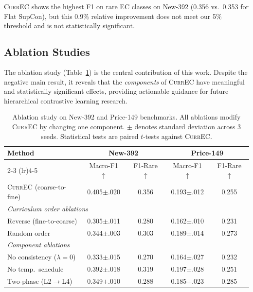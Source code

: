 \documentclass{article}
\newcommand{\currec}{\textsc{CurrEC}}
\begin{document}
\currec{} shows the highest F1 on rare EC classes on New-392 (0.356 vs.\ 0.353 for Flat SupCon), but this 0.9\% relative improvement does not meet our 5\% threshold and is not statistically significant.

\subsection{Ablation Studies}\label{sec:ablation}

The ablation study (Table~\ref{tab:ablation}) is the central contribution of this work. Despite the negative main result, it reveals that the \emph{components} of \currec{} have meaningful and statistically significant effects, providing actionable guidance for future hierarchical contrastive learning research.

\begin{table}[t]
\caption{Ablation study on New-392 and Price-149 benchmarks. All ablations modify \currec{} by changing one component. $\pm$ denotes standard deviation across 3 seeds. Statistical tests are paired $t$-tests against \currec{}.}
\label{tab:ablation}
\centering
\small
\begin{tabular}{lcccc}
\toprule
Method & \multicolumn{2}{c}{New-392} & \multicolumn{2}{c}{Price-149} \\
\cmidrule(lr){2-3} \cmidrule(lr){4-5}
 & Macro-F1 $\uparrow$ & F1-Rare $\uparrow$ & Macro-F1 $\uparrow$ & F1-Rare $\uparrow$ \\
\midrule
\currec{} (coarse-to-fine) & 0.405{\scriptsize $\pm$.020} & 0.356 & 0.193{\scriptsize $\pm$.012} & 0.255 \\
\midrule
\multicolumn{5}{l}{\textit{Curriculum order ablations}} \\
\quad Reverse (fine-to-coarse) & 0.305{\scriptsize $\pm$.011} & 0.280 & 0.162{\scriptsize $\pm$.010} & 0.231 \\
\quad Random order & 0.344{\scriptsize $\pm$.003} & 0.303 & 0.189{\scriptsize $\pm$.014} & 0.273 \\
\midrule
\multicolumn{5}{l}{\textit{Component ablations}} \\
\quad No consistency ($\lambda\!=\!0$) & 0.333{\scriptsize $\pm$.015} & 0.270 & 0.164{\scriptsize $\pm$.027} & 0.232 \\
\quad No temp.\ schedule & 0.392{\scriptsize $\pm$.018} & 0.319 & 0.197{\scriptsize $\pm$.028} & 0.251 \\
\quad Two-phase (L2$\rightarrow$L4) & 0.349{\scriptsize $\pm$.010} & 0.288 & 0.185{\scriptsize $\pm$.023} & 0.285 \\
\bottomrule
\end{tabular}
\end{table}
\end{document}

